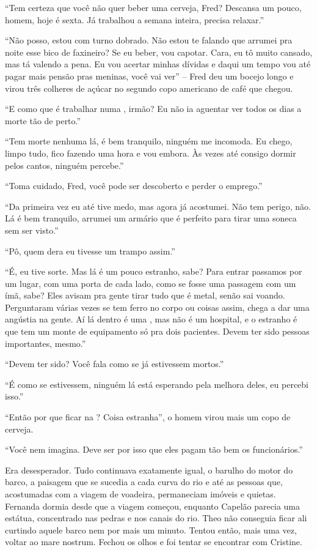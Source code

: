 ``Tem certeza que você não quer beber uma cerveja, Fred? Descansa um
pouco, homem, hoje é sexta. Já trabalhou a semana inteira, precisa
relaxar.''

``Não posso, estou com turno dobrado. Não estou te falando que arrumei
pra noite esse bico de faxineiro? Se eu beber, vou capotar. Cara, eu tô
muito cansado, mas tá valendo a pena. Eu vou acertar minhas dívidas e
daqui um tempo vou até pagar mais pensão pras meninas, você vai ver'' --
Fred deu um bocejo longo e virou três colheres de açúcar no segundo copo
americano de café que chegou.

``E como que é trabalhar numa , irmão? Eu não ia aguentar ver todos
os dias a morte tão de perto.''

``Tem morte nenhuma lá, é bem tranquilo, ninguém me incomoda. Eu chego,
limpo tudo, fico fazendo uma hora e vou embora. Às vezes até consigo
dormir pelos cantos, ninguém percebe.''

``Toma cuidado, Fred, você pode ser descoberto e perder o emprego.''

``Da primeira vez eu até tive medo, mas agora já acostumei. Não tem
perigo, não. Lá é bem tranquilo, arrumei um armário que é perfeito para
tirar uma soneca sem ser visto.''

``Pô, quem dera eu tivesse um trampo assim.''

``É, eu tive sorte. Mas lá é um pouco estranho, sabe? Para entrar
passamos por um lugar, com uma porta de cada lado, como se fosse uma
passagem com um ímã, sabe? Eles avisam pra gente tirar tudo que é metal,
senão sai voando. Perguntaram várias vezes se tem ferro no corpo ou
coisas assim, chega a dar uma angústia na gente. Aí lá dentro é uma ,
mas não é um hospital, e o estranho é que tem um monte de equipamento só
pra dois pacientes. Devem ter sido pessoas importantes, mesmo.''

``Devem ter sido? Você fala como se já estivessem mortos.''

``É como se estivessem, ninguém lá está esperando pela melhora deles, eu
percebi isso.''

``Então por que ficar na ? Coisa estranha'', o homem virou mais um
copo de cerveja.

``Você nem imagina. Deve ser por isso que eles pagam tão bem os
funcionários.''

\asterisc

Era desesperador. Tudo continuava exatamente igual, o barulho do motor
do barco, a paisagem que se sucedia a cada curva do rio e até as pessoas
que, acostumadas com a viagem de voadeira, permaneciam imóveis e
quietas. Fernanda dormia desde que a viagem começou, enquanto Capelão
parecia uma estátua, concentrado nas pedras e nos canais do rio. Theo
não conseguia ficar ali curtindo aquele barco nem por mais um minuto.
Tentou então, mais uma vez, voltar ao mare nostrum. Fechou os olhos e foi
tentar se encontrar com Cristine.


